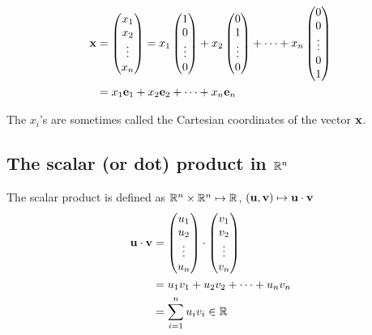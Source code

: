 \documentclass[10pt, a4paper]{article}
\begin{document}
\begin{example}
    \begin{align*}
    \mathbf{x} &= \begin{pmatrix}
        x_1 \\
        x_2 \\
        \vdots \\
        x_n
    \end{pmatrix}
    =
    x_1 \begin{pmatrix}
        1 \\
        0 \\
        \vdots \\
        0
    \end{pmatrix}
    +
    x_2 \begin{pmatrix}
        0 \\
        1 \\
        \vdots \\
        0
    \end{pmatrix}
    +
    \dots
    +
    x_n \begin{pmatrix}
        0 \\
        0 \\
        \vdots \\
        0 \\
        1
    \end{pmatrix} \\
    &= x_1 \mathbf{e}_1 + x_2 \mathbf{e}_2 + \dots + x_n \mathbf{e}_n
    \end{align*}
\end{example}
The $x_i$'s are sometimes called the Cartesian coordinates of the vector $\mathbf{x}$.

\subsection{The scalar (or dot) product in \texorpdfstring{$\mathbb{R} ^ n$}{}}

\begin{definition}
    The scalar product is defined as $\mathbb{R} ^ n \times \mathbb{R} ^ n \mapsto \mathbb{R}$, $(\mathbf{u, v}) \mapsto \mathbf{u \cdot v}$
    \begin{align*}
    \mathbf{u \cdot v} &= \begin{pmatrix}
        u_1 \\
        u_2 \\
        \vdots \\
        u_n
    \end{pmatrix} \cdot
    \begin{pmatrix}
        v_1 \\
        v_2 \\
        \vdots \\
        v_n
    \end{pmatrix} \\
    &= u_1 v_1 + u_2 v_2 + \dots + u_n v_n  \\
    &= \sum_{i = 1}^{n}u_iv_i \in \mathbb{R}
    \end{align*}
\end{definition}
\end{document}
